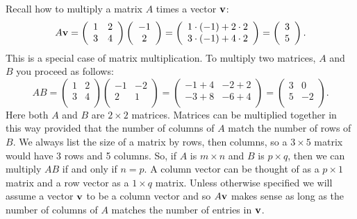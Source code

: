 Recall how to multiply a matrix $A$ times a vector $\mathbf{v}$:
$$
   A \mathbf{v} = \left( \begin{array}{cc}
                    1 & 2  \\
                    3 & 4  \\
                   \end{array} \right)
                    \left( \begin{array}{c}
                    -1  \\
                    2 \\
                   \end{array} \right)
=
\left( \begin{array}{c}
                    1 \cdot (-1) + 2 \cdot 2  \\
                    3 \cdot (-1) + 4 \cdot 2 \\
                   \end{array} \right)
=
\left( \begin{array}{c}
                   3  \\
                   5 \\
                   \end{array} \right).
$$
This is a special case of matrix multiplication. To
multiply two matrices, $A$ and $B$ you proceed as follows:
$$
   A B = \left( \begin{array}{cc}
                    1 & 2  \\
                    3 & 4  \\
                   \end{array} \right)
\left( \begin{array}{cc}
                    -1 & -2 \\
                    2 &  1\\
                   \end{array} \right)
=
\left( \begin{array}{cc}
                    -1 + 4 & -2 + 2  \\
                    -3 + 8 & -6 + 4 \\
                   \end{array} \right)
=
\left( \begin{array}{cc}
                   3 & 0 \\
                   5 & -2 \\
                   \end{array} \right).
$$
Here both $A$ and $B$ are $2 \times 2$ matrices.
Matrices can be multiplied together in this way provided
that the number of columns of $A$ match the number of rows
of $B$. We always list the size of a matrix by rows, then
columns, so a $3 \times 5$ matrix would have 3 rows and 5 columns.
So, if $A$ is $m \times n$ and $B$ is $p \times q$, then
we can multiply $AB$ if and only if $n = p$.
A column vector can be thought of as a $p \times 1$ matrix
and a row vector as a $1 \times q$ matrix. Unless otherwise specified
we will assume a vector $\mathbf{v}$ to be a column vector and
so $A\mathbf{v} $ makes sense as long as the number of columns of $A$
matches the number of entries in $\mathbf{v}$.

